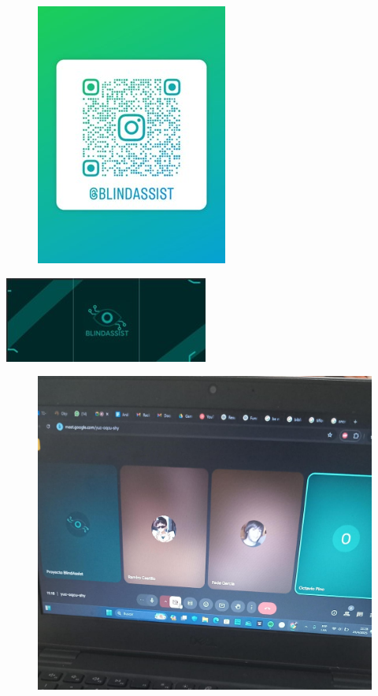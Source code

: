 \documentclass[12pt,a4paper]{article}
\begin{document}
\begin{figure}[H]
\begin{minipage}{0.45\textwidth}
        \includegraphics[width=\linewidth]{Carpeta de campo/Imagen3.jpg}
    \end{minipage}
\end{figure}
\includegraphics[width=\linewidth]{Carpeta de campo/Imagen4.jpg}

\begin{figure}
    \includegraphics[width=0.5\linewidth]{Carpeta de campo/Reunion.png}
\end{figure}
\end{document}

